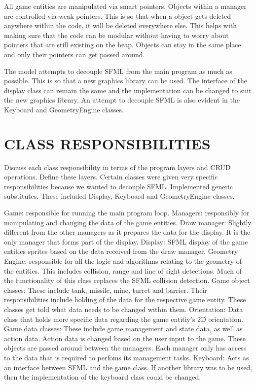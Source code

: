 \documentclass[10pt,twocolumn]{witseiepaper}
\begin{document}
All game entities are manipulated via smart pointers. Objects within a manager are controlled via weak pointers. This is so that when a object gets deleted anywhere within the code, it will be deleted everywhere else. This helps with making sure that the code can be modular without having to worry about pointers that are still existing on the heap. Objects can stay in the same place and only their pointers can get passed around.

The model attempts to decouple SFML from the main program as much as possible. This is so that a new graphics library can be used. The interface of the display class can remain the same and the implementation can be changed to suit the new graphics library. An attempt to decouple SFML is also evident in the Keyboard and GeometryEngine classes. 


%
\section{CLASS RESPONSIBILITIES} %
Discuss each class responsibility in terms of the program layers and CRUD operations. Define these layers. Certain classes were given very specific responsibilities because we wanted to decouple SFML. Implemented generic substitutes. These included Display, Keyboard and GeometryEngine classes. 

Game: responsible for running the main program loop.
Managers: responsibly for manipulating and changing the data of the game entities.
Draw manager: Slightly different from the other managers as it prepares the data for the display. It is the only manager that forms part of the display.
Display: SFML display of the game entities sprites based on the data received from the draw manager.
Geometry Engine: responsible for all the logic and algorithms relating to the geometry of the entities. This includes collision, range and line of sight detections. Much of the functionality of this class replaces the SFML collision detection. 
Game object classes: These include tank, missile, mine, turret and barrier. Their responsibilities include holding of the data for the respective game entity. These classes get told what data needs to be changed within them.
Orientation: Data class that holds more specific data regarding the game entitiy's 2D orientation.
Game data classes: These include game management and state data, as well as action data. Action data is changed based on the user input to the game. These objects are passed around between the managers. Each manager only has access to the data that is required to perfoms its management tasks.
Keyboard: Acts as an interface between SFML and the game class. If another library was to be used, then the implementation of the keyboard class could be changed.
\end{document}
